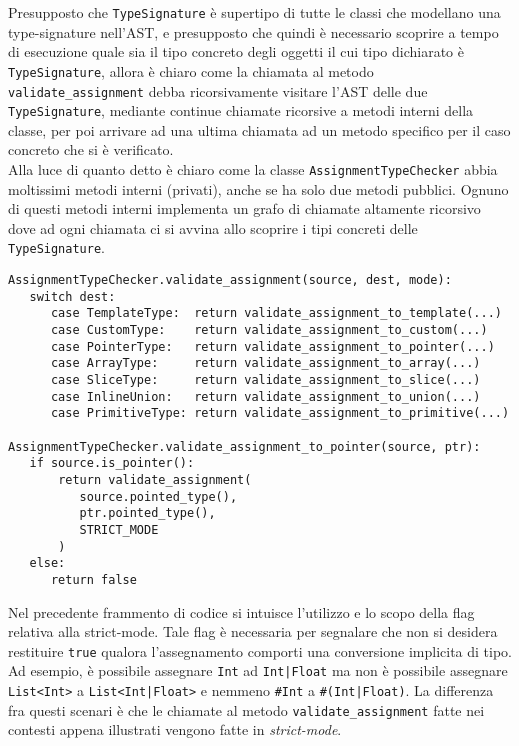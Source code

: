 \newpage

Presupposto che \texttt{TypeSignature} è supertipo di tutte le classi che modellano una type-signature nell'AST, e presupposto che 
quindi è necessario scoprire a tempo di esecuzione quale sia il tipo concreto degli oggetti il cui tipo dichiarato è \texttt{TypeSignature},
allora è chiaro come la chiamata al metodo \texttt{validate\_assignment} debba ricorsivamente visitare l'AST delle due \texttt{TypeSignature},
mediante continue chiamate ricorsive a metodi interni della classe, per poi arrivare ad una ultima chiamata ad un metodo specifico per 
il caso concreto che si è verificato. \\

Alla luce di quanto detto è chiaro come la classe \texttt{AssignmentTypeChecker} abbia moltissimi metodi interni (privati), anche se 
ha solo due metodi pubblici. Ognuno di questi metodi interni implementa un grafo di chiamate altamente ricorsivo dove ad ogni chiamata 
ci si avvina allo scoprire i tipi concreti delle \texttt{TypeSignature}. \\

\begin{lstlisting}[frame=single]
AssignmentTypeChecker.validate_assignment(source, dest, mode):
   switch dest:
      case TemplateType:  return validate_assignment_to_template(...)
      case CustomType:    return validate_assignment_to_custom(...)
      case PointerType:   return validate_assignment_to_pointer(...)
      case ArrayType:     return validate_assignment_to_array(...)
      case SliceType:     return validate_assignment_to_slice(...)
      case InlineUnion:   return validate_assignment_to_union(...)
      case PrimitiveType: return validate_assignment_to_primitive(...)

AssignmentTypeChecker.validate_assignment_to_pointer(source, ptr):
   if source.is_pointer():
       return validate_assignment(
          source.pointed_type(), 
          ptr.pointed_type(), 
          STRICT_MODE
       )
   else:
      return false
\end{lstlisting}
\vspace{0.5cm}

Nel precedente frammento di codice si intuisce l'utilizzo e lo scopo della flag relativa alla 
strict-mode. Tale flag è necessaria per segnalare che non si desidera restituire \texttt{true}
qualora l'assegnamento comporti una conversione implicita di tipo. \\

Ad esempio, è possibile assegnare \texttt{Int} ad \texttt{Int|Float} ma non è 
possibile assegnare \texttt{List<Int>} a \texttt{List<Int|Float>} e nemmeno 
\texttt{\#Int} a \texttt{\#(Int|Float)}. La differenza fra questi scenari è che le chiamate al 
metodo \texttt{validate\_assignment} fatte nei contesti appena illustrati vengono fatte in \textit{strict-mode}. \\

